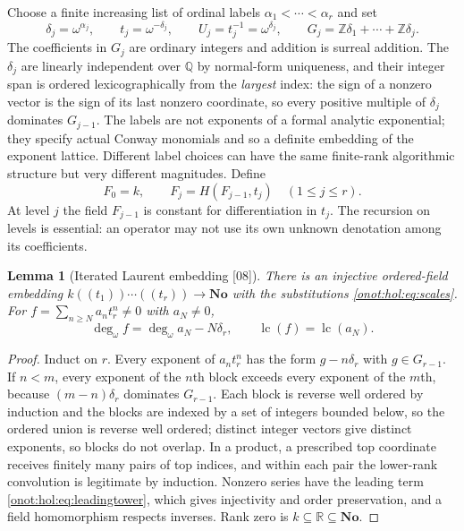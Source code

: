 \documentclass[11pt,oneside]{article}
\numberwithin{equation}{section}
\newtheorem{lemma}[lemma]{Lemma}
\theoremstyle{definition}
\theoremstyle{remark}
\newcommand{\No}{\mathbf{No}}
\newcommand{\Z}{\mathbb Z}
\newcommand{\Q}{\mathbb Q}
\newcommand{\R}{\mathbb R}
\newcommand{\lc}{\operatorname{lc}}
\newcommand{\ddeg}{\operatorname{deg}_{\omega}}
\newcommand{\src}[1]{\textup{\textsf{\small[#1]}}}
\begin{document}
Choose a finite increasing list of ordinal labels $\alpha_1<\cdots<\alpha_r$ and
set
\begin{equation}\label{onot:hol:eq:scales}
 \delta_j=\omega^{\alpha_j},\qquad t_j=\omega^{-\delta_j},\qquad U_j=t_j^{-1}=\omega^{\delta_j},\qquad G_j=\Z\delta_1+\cdots+\Z\delta_j.
\end{equation}
The coefficients in $G_j$ are ordinary integers and addition is surreal
addition. The $\delta_j$ are linearly independent over $\Q$ by normal-form
uniqueness, and their integer span is ordered lexicographically from the
\emph{largest} index: the sign of a nonzero vector is the sign of its last
nonzero coordinate, so every positive multiple of $\delta_j$ dominates $G_{j-1}$.
The labels are not exponents of a formal analytic exponential; they specify
actual Conway monomials and so a definite embedding of the exponent lattice.
Different label choices can have the same finite-rank algorithmic structure but
very different magnitudes. Define
\begin{equation}\label{onot:hol:eq:tower}
 F_0=k,\qquad F_j=H(F_{j-1},t_j)\quad(1\le j\le r).
\end{equation}
At level $j$ the field $F_{j-1}$ is constant for differentiation in $t_j$. The
recursion on levels is essential: an operator may not use its own unknown
denotation among its coefficients.

\begin{lemma}[Iterated Laurent embedding \src{08}]\label{onot:hol:lem:embedding}
There is an injective ordered-field embedding
$k((t_1))\cdots((t_r))\to\No$ with the substitutions \eqref{onot:hol:eq:scales}.
For $f=\sum_{n\ge N}a_nt_r^n\ne0$ with $a_N\ne0$,
\begin{equation}\label{onot:hol:eq:leadingtower}
 \ddeg f=\ddeg a_N-N\delta_r,\qquad \lc(f)=\lc(a_N).
\end{equation}
\end{lemma}
\begin{proof}
Induct on $r$. Every exponent of $a_nt_r^n$ has the form $g-n\delta_r$ with
$g\in G_{r-1}$. If $n<m$, every exponent of the $n$th block exceeds every
exponent of the $m$th, because $(m-n)\delta_r$ dominates $G_{r-1}$. Each block is
reverse well ordered by induction and the blocks are indexed by a set of integers
bounded below, so the ordered union is reverse well ordered; distinct integer
vectors give distinct exponents, so blocks do not overlap. In a product, a
prescribed top coordinate receives finitely many pairs of top indices, and within
each pair the lower-rank convolution is legitimate by induction. Nonzero series
have the leading term \eqref{onot:hol:eq:leadingtower}, which gives injectivity
and order preservation, and a field homomorphism respects inverses. Rank zero is
$k\subseteq\R\subseteq\No$.
\end{proof}
\end{document}
